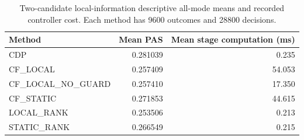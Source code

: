 \begin{table}[htbp]\centering\small
\caption{Two-candidate local-information descriptive all-mode means and recorded controller cost. Each method has 9600 outcomes and 28800 decisions.}\label{tab:revised_summary}
\begin{tabular}{lrr}\toprule Method & Mean PAS & Mean stage computation (ms)\\\midrule
CDP & 0.281039 & 0.235\\
CF\_LOCAL & 0.257409 & 54.053\\
CF\_LOCAL\_NO\_GUARD & 0.257410 & 17.350\\
CF\_STATIC & 0.271853 & 44.615\\
LOCAL\_RANK & 0.253506 & 0.213\\
STATIC\_RANK & 0.266549 & 0.215\\
\bottomrule\end{tabular}
\end{table}
